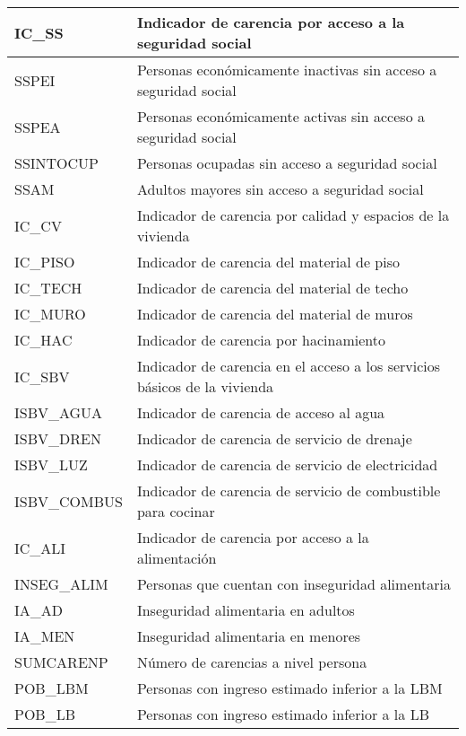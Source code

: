 \begin{longtable}{|p{8cm}|p{8cm}|}
    \hline
    IC\_SS & Indicador de carencia por acceso a la seguridad social \\
    \hline
    SSPEI & Personas económicamente inactivas sin acceso a seguridad social \\
    \hline
    SSPEA & Personas económicamente activas sin acceso a seguridad social \\
    \hline
    SSINTOCUP & Personas ocupadas sin acceso a seguridad social \\
    \hline
    SSAM & Adultos mayores sin acceso a seguridad social\\
    \hline
    IC\_CV & Indicador de carencia por calidad y espacios de la vivienda \\
    \hline
    IC\_PISO & Indicador de carencia del material de piso \\
    \hline
    IC\_TECH & Indicador de carencia del material de techo \\
    \hline
    IC\_MURO & Indicador de carencia del material de muros \\
    \hline
    IC\_HAC & Indicador de carencia por hacinamiento \\
    \hline
    IC\_SBV & Indicador de carencia en el acceso a los servicios básicos de la vivienda \\
    \hline
    ISBV\_AGUA & Indicador de carencia de acceso al agua \\
    \hline
    ISBV\_DREN & Indicador de carencia de servicio de drenaje \\
    \hline
    ISBV\_LUZ & Indicador de carencia de servicio de electricidad \\
    \hline
    ISBV\_COMBUS & Indicador de carencia de servicio de combustible para cocinar \\
    \hline
    IC\_ALI & Indicador de carencia por acceso a la alimentación \\
    \hline
    INSEG\_ALIM & Personas que cuentan con inseguridad alimentaria \\
    \hline
    IA\_AD & Inseguridad alimentaria en adultos \\
    \hline
    IA\_MEN & Inseguridad alimentaria en menores \\
    \hline
    SUMCARENP & Número de carencias a nivel persona \\
    \hline
    POB\_LBM & Personas con ingreso estimado inferior a la LBM \\
    \hline
    POB\_LB & Personas con ingreso estimado inferior a la LB \\
    \hline
    \hline

\end{longtable}
